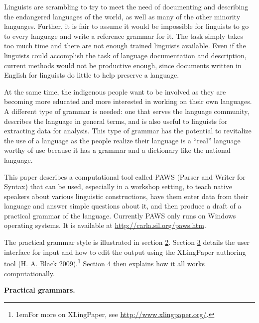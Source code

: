\documentclass[12pt]{article}
\begin{document}
Linguists are scrambling to try to meet the need of documenting and describing the endangered languages of the world, as well as many of the other minority languages. Further, it is fair to assume it would be impossible for linguists to go to every language and write a reference grammar for it. The task simply takes too much time and there are not enough trained linguists available. Even if the linguists could accomplish the task of language documentation and description, current methods would not be productive enough, since documents written in English for linguists do little to help preserve a language.\par{}\indent At the same time, the indigenous people want to be involved as they are becoming more educated and more interested in working on their own languages. A different type of grammar is needed: one that serves the language community, describes the language in general terms, and is also useful to linguists for extracting data for analysis. This type of grammar has the potential to revitalize the use of a language as the people realize their language is a “real” language worthy of use because it has a grammar and a dictionary like the national language.\par{}\indent This paper describes a computational tool called {PAWS} (Parser and Writer for Syntax) that can be used, especially in a workshop setting, to teach native speakers about various linguistic constructions, have them enter data from their language and answer simple questions about it, and then produce a draft of a practical grammar of the language. Currently {PAWS} only runs on Windows operating systems. It is available at \href{http://carla.sil.org/paws.htm}{http://carla.sil.org/paws.htm}.\par{}\indent The practical grammar style is illustrated in section \hyperlink{sPractical}{2}. Section \hyperlink{sInterface}{3} details the user interface for input and how to edit the output using the {XLingPaper} authoring tool (\hyperlink{rXLingPaper}{H. A. Black  2009)}.\protect\footnote[1]{{\parindent1em\protect\hypertarget{nXLingPaper}{}For more on {XLingPaper}, see \href{http://www.xlingpaper.org/}{http://www.xlingpaper.org/}.}} Section \hyperlink{sComp}{4} then explains how it all works computationally.\par{}\vspace{.25in}\noindent\protect\hypertarget{sPractical}{{\noindent
\textbf{{ }}}}{\noindent
\textbf{{\protect\noindent
Practical grammars. }}}
\end{document}
